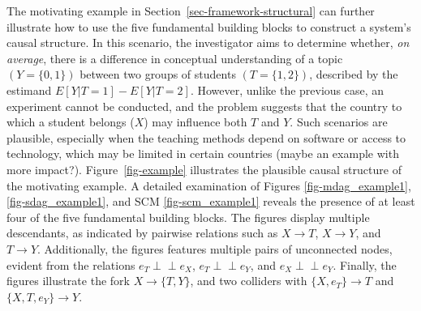 \documentclass[
  authoryear,
  preprint,
  1p]{elsarticle}
\begin{document}
The motivating example in Section~\ref{sec-framework-structural} can
further illustrate how to use the five fundamental building blocks to
construct a system's causal structure. In this scenario, the
investigator aims to determine whether, \emph{on average}, there is a
difference in conceptual understanding of a topic \((Y=\{0,1\})\)
between two groups of students \((T=\{1,2\})\), described by the
estimand \(E[Y| T=1] - E[Y| T=2]\). However, unlike the previous case,
an experiment cannot be conducted, and the problem suggests that the
country to which a student belongs (\(X\)) may influence both \(T\) and
\(Y\). Such scenarios are plausible, especially when the teaching
methods depend on software or access to technology, which may be limited
in certain countries {(maybe an example with more impact?)}.
Figure~\ref{fig-example} illustrates the plausible causal structure of
the motivating example. A detailed examination of Figures
\ref{fig-mdag_example1}, \ref{fig-sdag_example1}, and SCM
\ref{fig-scm_example1} reveals the presence of at least four of the five
fundamental building blocks. The figures display multiple descendants,
as indicated by pairwise relations such as \(X \rightarrow T\),
\(X \rightarrow Y\), and \(T \rightarrow Y\). Additionally, the figures
features multiple pairs of unconnected nodes, evident from the relations
\(e_{T} \perp\!\!\!\perp e_{X}\), \(e_{T} \perp\!\!\!\perp e_{Y}\), and
\(e_{X} \perp\!\!\!\perp e_{Y}\). Finally, the figures illustrate the
fork \(X \rightarrow \{T,Y\}\), and two colliders with
\(\{X,e_{T}\} \rightarrow T\) and \(\{X,T,e_{Y}\} \rightarrow Y\).
\end{document}
